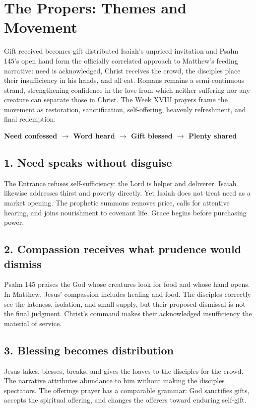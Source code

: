 \section*{The Propers: Themes and Movement}
\label{triptych:brief-synthesis:start}
\begin{massbox}{Gift received becomes gift distributed}
Isaiah's unpriced invitation and Psalm 145's open hand form the officially correlated approach to Matthew's feeding narrative: need is acknowledged, Christ receives the crowd, the disciples place their insufficiency in his hands, and all eat. Romans remains a semi-continuous strand, strengthening confidence in the love from which neither suffering nor any creature can separate those in Christ. The Week XVIII prayers frame the movement as restoration, sanctification, self-offering, heavenly refreshment, and final redemption.
\end{massbox}
\begin{center}
\textbf{Need confessed $\longrightarrow$ Word heard $\longrightarrow$ Gift blessed $\longrightarrow$ Plenty shared}
\end{center}

\subsection*{1. Need speaks without disguise\enspace{}}
The Entrance refuses self-sufficiency: the Lord is helper and deliverer. Isaiah likewise addresses thirst and poverty directly. Yet Isaiah does not treat need as a market opening. The prophetic summons removes price, calls for attentive hearing, and joins nourishment to covenant life. Grace begins before purchasing power.

\subsection*{2. Compassion receives what prudence would dismiss\enspace{}}
Psalm 145 praises the God whose creatures look for food and whose hand opens. In Matthew, Jesus' compassion includes healing and food. The disciples correctly see the lateness, isolation, and small supply, but their proposed dismissal is not the final judgment. Christ's command makes their acknowledged insufficiency the material of service.

\subsection*{3. Blessing becomes distribution\enspace{}}
Jesus takes, blesses, breaks, and gives the loaves to the disciples for the crowd. The narrative attributes abundance to him without making the disciples spectators. The offerings prayer has a comparable grammar: God sanctifies gifts, accepts the spiritual offering, and changes the offerers toward enduring self-gift.

